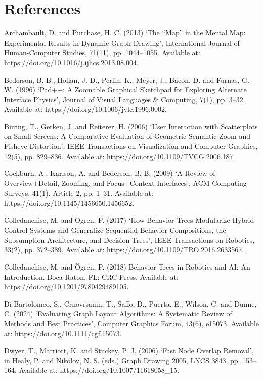 \chapter*{References}

Archambault, D. and Purchase, H. C. (2013) ‘The “Map” in the Mental Map: Experimental Results in Dynamic Graph Drawing’, International Journal of Human-Computer Studies, 71(11), pp. 1044–1055. Available at: https://doi.org/10.1016/j.ijhcs.2013.08.004.

Bederson, B. B., Hollan, J. D., Perlin, K., Meyer, J., Bacon, D. and Furnas, G. W. (1996) ‘Pad++: A Zoomable Graphical Sketchpad for Exploring Alternate Interface Physics’, Journal of Visual Languages \& Computing, 7(1), pp. 3–32. Available at: https://doi.org/10.1006/jvlc.1996.0002.

Büring, T., Gerken, J. and Reiterer, H. (2006) ‘User Interaction with Scatterplots on Small Screens: A Comparative Evaluation of Geometric-Semantic Zoom and Fisheye Distortion’, IEEE Transactions on Visualization and Computer Graphics, 12(5), pp. 829–836. Available at: https://doi.org/10.1109/TVCG.2006.187.

Cockburn, A., Karlson, A. and Bederson, B. B. (2009) ‘A Review of Overview+Detail, Zooming, and Focus+Context Interfaces’, ACM Computing Surveys, 41(1), Article 2, pp. 1–31. Available at: https://doi.org/10.1145/1456650.1456652.

Colledanchise, M. and Ögren, P. (2017) ‘How Behavior Trees Modularize Hybrid Control Systems and Generalize Sequential Behavior Compositions, the Subsumption Architecture, and Decision Trees’, IEEE Transactions on Robotics, 33(2), pp. 372–389. Available at: https://doi.org/10.1109/TRO.2016.2633567.

Colledanchise, M. and Ögren, P. (2018) Behavior Trees in Robotics and AI: An Introduction. Boca Raton, FL: CRC Press. Available at: https://doi.org/10.1201/9780429489105.

Di Bartolomeo, S., Crnovrsanin, T., Saffo, D., Puerta, E., Wilson, C. and Dunne, C. (2024) ‘Evaluating Graph Layout Algorithms: A Systematic Review of Methods and Best Practices’, Computer Graphics Forum, 43(6), e15073. Available at: https://doi.org/10.1111/cgf.15073.

Dwyer, T., Marriott, K. and Stuckey, P. J. (2006) ‘Fast Node Overlap Removal’, in Healy, P. and Nikolov, N. S. (eds.) Graph Drawing 2005, LNCS 3843, pp. 153–164. Available at: https://doi.org/10.1007/11618058\_15.

